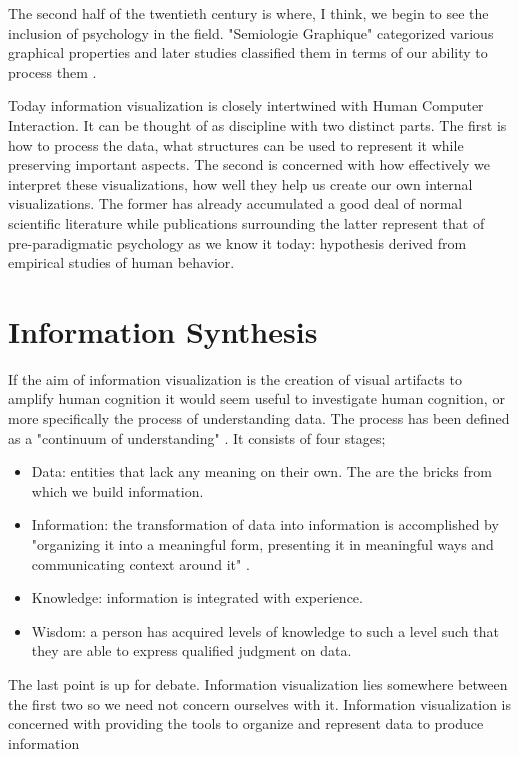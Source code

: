 \documentclass[a4paper, 10pt, titlepage]{article}
\begin{document}
The second half of the twentieth century is where, I think, we begin to see the inclusion of psychology in the field. "Semiologie Graphique" categorized various graphical properties and later studies classified them in terms of our ability to process them \cite{cleveland1984graphical}.

Today information visualization is closely intertwined with Human Computer Interaction. It can be thought of as discipline with two distinct parts. The first is how to process the data, what structures can be used to represent it while preserving important aspects. The second is concerned with how effectively we interpret these visualizations, how well they help us create our own internal visualizations. The former has already accumulated a good deal of normal scientific literature while publications surrounding the latter represent that of pre-paradigmatic psychology as we know it today: hypothesis derived from empirical studies of human behavior.


\section{Information Synthesis}
If the aim of information visualization is the creation of visual artifacts to amplify human cognition it would seem useful to investigate human cognition, or more specifically the process of understanding data. The process has been defined as a "continuum of understanding" \cite{jacobson1999information}. It consists of four stages;
\begin{itemize}
\item Data: entities that lack any meaning on their own. The are the bricks from which we build information.
\item Information: the transformation of data into information is accomplished by "organizing it into a meaningful form, presenting it in meaningful ways and communicating context around it" \cite{jacobson1999information}.
\item Knowledge: information is integrated with experience.
\item Wisdom: a person has acquired levels of knowledge to such a level such that they are able to express qualified judgment on data.
\end{itemize}

The last point is up for debate. Information visualization lies somewhere between the first two so we need not concern ourselves with it. Information visualization is concerned with providing the tools to organize and represent data to produce information
\end{document}
